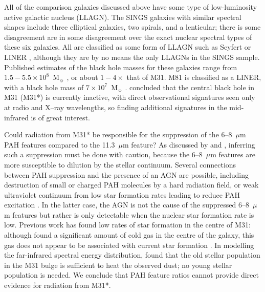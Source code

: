 All of the comparison galaxies discussed above have some type of low-luminosity active galactic nucleus (LLAGN).
The SINGS galaxies with similar spectral shapes include  three elliptical galaxies, two spirals, and a lenticular;
there is some disagreement  \citep{kennicutt03,Smith:2007lr, moustakas2010} are in some disagreement over the
exact nuclear spectral types of these six galaxies.  All are classified as some form of LLAGN
such as Seyfert or LINER \citep[luminous AGNs were intentionally omitted from the SINGS sample;][]{kennicutt03}, although they are
by no means the only LLAGNs in the SINGS sample.
Published estimates of the black hole masses for these galaxies range from $1.5-5.5\times10^{8}$~M$_{\sun}$
\citep[for NGC~1316 and NGC~4595, respectively]{nowak08, kormendy88}, or about $1-4\times$ that of M31.
M81 is classified as a LINER, with a black hole mass of $7\times10^7$~M$_{\sun}$ \citep{devereux03}.
\citet{Li09} concluded that the central black hole in M31 (M31*) is currently inactive, with direct observational signatures seen only
at radio and X--ray wavelengths, so finding additional signatures in the mid-infrared is of great interest.



Could radiation from M31* be responsible for the suppression of the  6--8~$\mu$m PAH features compared
to the 11.3~$\mu$m feature?
As discussed by  \citet{Smith:2007lr} and \citet{Smith2010}, inferring such a suppression must be done with caution, 
because the 6--8~$\mu$m features are more susceptible to dilution by the stellar continuum. 
Several connections between PAH suppression and the presence of an AGN are possible, including destruction of small 
or charged PAH molecules by a hard radiation field, or weak ultraviolet continuum from low star formation rates 
leading to reduce PAH excitation \citep{Smith:2007lr}.  In the latter case, the AGN is not the cause of
the suppressed  6--8~$\mu$m features but rather is only detectable when the nuclear star formation rate is low.
Previous work has found low rates of star formation in the centre of M31: although \citet{Melchior2013} found a significant 
amount of cold gas in the centre of the galaxy, this gas does not appear to be associated with current star formation \citep[see also][]{li09}.
In modelling the far-infrared spectral energy distribution, \cite{Groves2012} found that  
the old stellar population in the M31 bulge is sufficient  to heat the observed dust; no young stellar population is needed.
We conclude that PAH feature ratios cannot provide direct evidence for radiation from M31*.



